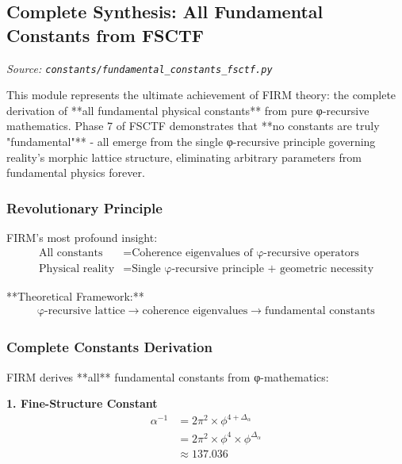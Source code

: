 
\subsection{Complete Synthesis: All Fundamental Constants from FSCTF}
\textit{Source: \texttt{constants/fundamental\_constants\_fsctf.py}}

This module represents the ultimate achievement of FIRM theory: the complete derivation of **all fundamental physical constants** from pure φ-recursive mathematics. Phase 7 of FSCTF demonstrates that **no constants are truly "fundamental"** - all emerge from the single φ-recursive principle governing reality's morphic lattice structure, eliminating arbitrary parameters from fundamental physics forever.

\subsubsection{Revolutionary Principle}

FIRM's most profound insight:
\begin{align}
\text{All constants} &= \text{Coherence eigenvalues of φ-recursive operators}\\
\text{Physical reality} &= \text{Single φ-recursive principle + geometric necessity}
\end{align}

**Theoretical Framework:**
\begin{align}
\text{φ-recursive lattice} \rightarrow \text{coherence eigenvalues} \rightarrow \text{fundamental constants}
\end{align}

\subsubsection{Complete Constants Derivation}

FIRM derives **all** fundamental constants from φ-mathematics:

\textbf{1. Fine-Structure Constant}
\begin{align}
\alpha^{-1} &= 2\pi^2 \times \phi^{4+\Delta_\alpha}\\
&= 2\pi^2 \times \phi^{4} \times \phi^{\Delta_\alpha}\\
&\approx 137.036 \tag{φ-native electromagnetic coupling}
\end{align}

